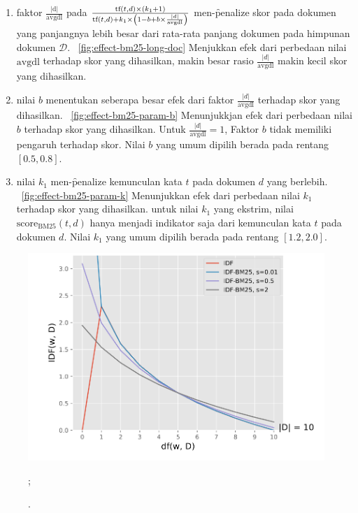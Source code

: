     \begin{enumerate}
        \item faktor $\frac{|\text{d}|}{\text{avgdl}}$ pada $\frac{\text{tf}(t, d) \times (k_1 + 1)}{\text{tf}(t, d) + k_1 \times \left(1 - b + b \times \textcolor{black}{\frac{|d|}{\text{avgdl}}}\right)}$ men-\f{penalize} skor pada dokumen yang panjangnya lebih besar dari rata-rata panjang dokumen pada himpunan dokumen $\mathcal{D}$. \pic~\ref{fig:effect-bm25-long-doc} Menjukkan efek dari perbedaan nilai $\text{avgdl}$ terhadap skor yang dihasilkan, makin besar rasio $\frac{|d|}{\text{avgdl}}$ makin kecil skor yang dihasilkan.
        \item nilai $b$ menentukan seberapa besar efek dari faktor $\frac{|d|}{\text{avgdl}}$ terhadap skor yang dihasilkan. \pic~\ref{fig:effect-bm25-param-b} Menunjukkjan efek dari perbedaan nilai $b$ terhadap skor yang dihasilkan. Untuk $\frac{|d|}{\text{avgdl}}=1$, Faktor $b$ tidak memiliki pengaruh terhadap skor. Nilai $b$ yang umum dipilih berada pada rentang $[0.5, 0.8]$.
        \item  nilai $k_1$ men-\f{penalize} kemunculan kata $t$ pada dokumen $d$ yang berlebih. \pic~\ref{fig:effect-bm25-param-k} Menunjukkan efek dari perbedaan nilai $k_1$ terhadap skor yang dihasilkan. untuk nilai $k_1$ yang ekstrim, nilai $\text{score}_{\text{BM25}}(t,d)$ hanya menjadi indikator saja dari kemunculan kata $t$ pada dokumen $d$. Nilai $k_1$ yang umum dipilih berada pada rentang $[1.2, 2.0]$.
    \end{enumerate}

    \begin{figure}
        \centering
        \includegraphics[width=1\textwidth]{assets/pics/smoothed-idf.png}
        \caption{\license.};
        \label{fig:smoothed-idf}
    \end{figure}

